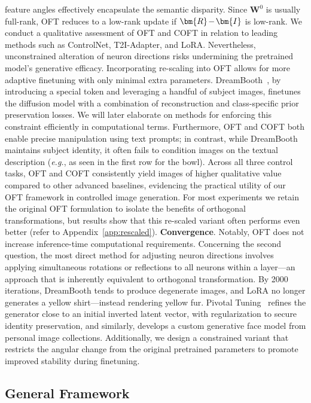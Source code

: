 \begin{itemize}[leftmargin=*,nosep]
\begin{itemize}[leftmargin=*,nosep]
feature angles effectively encapsulate the semantic disparity. Since $\bm{W}^0$ is usually full-rank, OFT reduces to a low-rank update if $\thickmuskip=2mu \medmuskip=2mu \bm{R}-\bm{I}$ is low-rank. We conduct a qualitative assessment of OFT and COFT in relation to leading methods such as ControlNet, T2I-Adapter, and LoRA. Nevertheless, unconstrained alteration of neuron directions risks undermining the pretrained model’s generative efficacy. Incorporating re-scaling into OFT allows for more adaptive finetuning with only minimal extra parameters. DreamBooth~\cite{ruiz2023dreambooth}, by introducing a special token and leveraging a handful of subject images, finetunes the diffusion model with a combination of reconstruction and class-specific prior preservation losses. We will later elaborate on methods for enforcing this constraint efficiently in computational terms. Furthermore, OFT and COFT both enable precise manipulation using text prompts; in contrast, while DreamBooth maintains subject identity, it often fails to condition images on the textual description (\emph{e.g.}, as seen in the first row for the bowl). Across all three control tasks, OFT and COFT consistently yield images of higher qualitative value compared to other advanced baselines, evidencing the practical utility of our OFT framework in controlled image generation. For most experiments we retain the original OFT formulation to isolate the benefits of orthogonal transformations, but results show that this re-scaled variant often performs even better (refer to Appendix~\ref{app:rescaled}). \textbf{Convergence}. Notably, OFT does not increase inference-time computational requirements. Concerning the second question, the most direct method for adjusting neuron directions involves applying simultaneous rotations or reflections to all neurons within a layer—an approach that is inherently equivalent to orthogonal transformation. By 2000 iterations, DreamBooth tends to produce degenerate images, and LoRA no longer generates a yellow shirt—instead rendering yellow fur. Pivotal Tuning~\cite{roich2022pivotal} refines the generator close to an initial inverted latent vector, with regularization to secure identity preservation, and similarly, \cite{nitzan2022mystyle} develops a custom generative face model from personal image collections. Additionally, we design a constrained variant that restricts the angular change from the original pretrained parameters to promote improved stability during finetuning. \subsection{General Framework}


\end{itemize}
\end{itemize}
